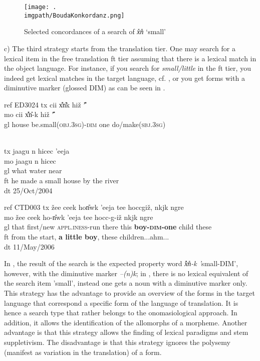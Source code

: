 \begin{figure}
\texttt{[image: .\\imgpath/BoudaKonkordanz.png]}
\caption{Selected concordances of a search of \textit{x{\U}n{\U}} `small'}
\label{bouda:fig:concordances}
\end{figure}

c) The third strategy starts from the translation tier. One may search for a lexical item in the free translation ft tier assuming that there is a lexical match in the object language. For instance, if you search for \textit{small/little} in the ft tier, you indeed get lexical matches in the target language, cf. , or you get forms with a diminutive marker (glossed DIM) as can be seen in . 

\newpage
\let\eachwordthree=\rm
\ea\label{bouda:ex:ED3024}
ref ED3024
\glll 
tx cii x{\U}{\U}n{\U}{\II}k hi\v{z}{\A} '{\U}{\U}    \\
mo cii x{\U}{\U}n{\U}-{\II}k hi\v{z}{\A} '{\U}{\U}     \\
gl house be.small(\textsc{obj}.\textsc{3sg})-\textsc{dim} one do/make(\textsc{sbj}.\textsc{3sg})      \\\

\glll 
tx jaagu n{\II}{\II} hicec 'eeja \\
mo jaagu n{\II}{\II} hicec \\
gl  what water near\\

ft he made a small house by the river\\
dt 25/Oct/2004\\
\z
 
\ea\label{bouda:ex:CTD003}
ref CTD003
\glll 
tx \v{z}ee ceek hon{\U}w{\A}k 'eeja tee hoc{\II}c{\II}gi\v{z}{\A}, n{\II}{\II}kj{\A}k n{\A}{\A}gre \\
mo \v{z}ee ceek ho-n{\U}w{\A}k 'eeja tee hoc{\II}c{\II}-{\II}g-i\v{z}{\A} n{\II}{\II}kj{\A}k n{\A}{\A}gre\\
gl that first/new \textsc{appl}.\textsc{iness}-run there this \textbf{boy-\textsc{dim}-one} child these\\
ft from the start, \textbf{a little boy}, these children...ahm... \\
dt 11/May/2006\\
\z

In , the result of the search is the expected property word \textit{x{\U}{\U}n{\U}-{\II}k '}small-DIM', however, with the diminutive marker \textit{--(n){\II}k}; in , there is no lexical equivalent of the search item 'small', instead one gets a noun with a diminutive marker only. This strategy has the advantage to provide an overview of the forms in the target language that correspond a specific form of the language of translation. It is hence a search type that rather belongs to the onomasiological approach. In addition, it allows the identification of the allomorphs of a morpheme. Another advantage is that this strategy allows the finding of lexical paradigms and stem suppletivism. The disadvantage is that this strategy ignores the polysemy (manifest as variation in the translation) of a form.

